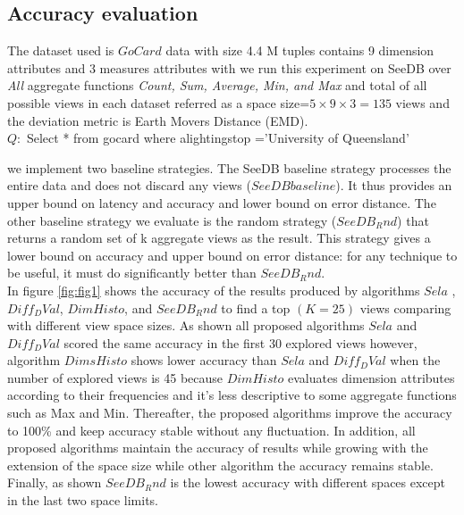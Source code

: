 \subsection{Accuracy evaluation}
The dataset used is $GoCard$ data with size 4.4 M tuples contains 9 dimension attributes and 3 measures attributes with we run this experiment on SeeDB over \emph{All} aggregate functions \emph{Count, Sum, Average, Min, and Max} and total of all possible views in each dataset referred as a space size=$5 \times 9 \times 3=135$ views and 
the deviation metric is Earth Movers Distance (EMD). \\ %
\footnotesize {$Q:$ Select * from gocard where alightingstop ='University of Queensland'} 

\normalsize 
we implement two baseline strategies. The SeeDB baseline strategy processes the entire data and does not discard any views ($SeeDB baseline$). It thus provides an upper bound on 
latency and accuracy and lower bound on error distance. The other baseline strategy we evaluate is the random strategy ($SeeDB_Rnd$) that returns a random set of k aggregate views as the result. This strategy gives a lower bound on accuracy and upper bound on error distance: for any technique to be useful, it must do significantly better than $SeeDB_Rnd$.
\\ In figure \ref{fig:fig1} shows the accuracy of the results produced by algorithms $Sela$ , $Diff_DVal$, $DimHisto$, and $SeeDB_Rnd$ to find a top $(K=25)$ views
 comparing with different view space sizes. As shown all proposed algorithms  $Sela$ and $Diff_DVal$ scored the same accuracy in the first 30 explored views however, algorithm $DimsHisto$ shows lower accuracy than $Sela$ and $Diff_DVal$ when the number of explored views is 45 because $DimHisto$ evaluates dimension attributes according to their frequencies and it's less descriptive to some aggregate functions such as Max and Min.  Thereafter, the proposed algorithms improve the accuracy to 100\% and keep accuracy stable without any fluctuation.
 In addition,  
all proposed algorithms maintain the accuracy of 
results while growing with the extension of the space size while other algorithm 
the accuracy remains stable. Finally, as shown  $SeeDB_Rnd$ is the lowest 
accuracy with different spaces except in the last two space limits. 

